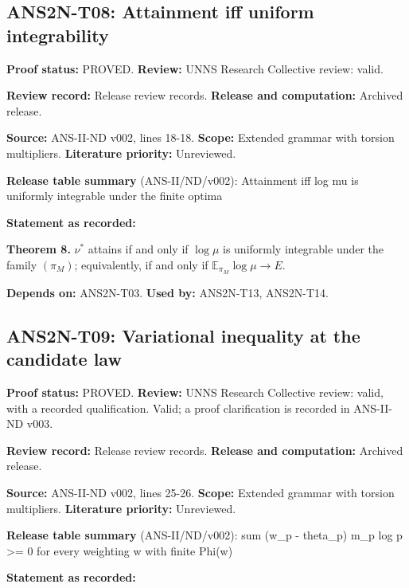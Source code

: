 \documentclass[
  11pt,
]{article}
\begin{document}
\hypertarget{ans2n-t08-attainment-iff-uniform-integrability}{%
\subsection{ANS2N-T08: Attainment iff uniform
integrability}\label{ans2n-t08-attainment-iff-uniform-integrability}}

\textbf{Proof status:} PROVED. \textbf{Review:} UNNS Research Collective
review: valid.

\textbf{Review record:} Release review records. \textbf{Release and
computation:} Archived release.

\textbf{Source:} ANS-II-ND v002, lines 18-18. \textbf{Scope:} Extended
grammar with torsion multipliers. \textbf{Literature priority:}
Unreviewed.

\textbf{Release table summary} (ANS-II/ND/v002): Attainment iff log mu
is uniformly integrable under the finite optima

\textbf{Statement as recorded:}

\textbf{Theorem 8.} \(\nu^\ast\) attains if and only if \(\log\mu\) is
uniformly integrable under the family \((\pi_M)\); equivalently, if and
only if \(\mathbb E_{\pi_M}\log\mu\to E\).

\textbf{Depends on:} ANS2N-T03. \textbf{Used by:} ANS2N-T13, ANS2N-T14.

\hypertarget{ans2n-t09-variational-inequality-at-the-candidate-law}{%
\subsection{ANS2N-T09: Variational inequality at the candidate
law}\label{ans2n-t09-variational-inequality-at-the-candidate-law}}

\textbf{Proof status:} PROVED. \textbf{Review:} UNNS Research Collective
review: valid, with a recorded qualification. Valid; a proof
clarification is recorded in ANS-II-ND v003.

\textbf{Review record:} Release review records. \textbf{Release and
computation:} Archived release.

\textbf{Source:} ANS-II-ND v002, lines 25-26. \textbf{Scope:} Extended
grammar with torsion multipliers. \textbf{Literature priority:}
Unreviewed.

\textbf{Release table summary} (ANS-II/ND/v002): sum (w\_p - theta\_p)
m\_p log p \textgreater= 0 for every weighting w with finite Phi(w)

\textbf{Statement as recorded:}
\end{document}
